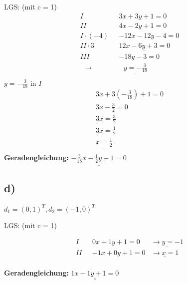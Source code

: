 \documentclass{article}
\begin{document}
LGS: (mit c = 1)
\begin{align*}
    I \ \ \ & 3x + 3y + 1 = 0 \\
    II \ \ \ & 4x - 2y + 1 = 0 \\
    I \cdot (-4) \ \ \ & -12x - 12y - 4 = 0\\
    II \cdot 3 \ \ \ & \underline{ 12x - 6y + 3= 0} \\
    III \ \ \ & -18y - 3 = 0 \\
    \ \ \ \rightarrow & \ \ \ \underline{y = -\frac{3}{18}} \\
\end{align*}
$y = -\frac{3}{18}$ in $I$
\begin{align*}
    3x + 3(-\frac{3}{18}) + 1 = 0 \\
    3x - \frac{3}{2} = 0 \\
    3x = \frac{3}{2}\\
    3x = \frac{1}{2}\\
    \underline{x = \frac{1}{2}} \\
\end{align*}
\textbf{Geradengleichung:} $\underline{\underline{-\frac{3}{18}x - \frac{1}{2}y + 1 = 0}}$

\subsection*{d)}
$d_1 = (0,1)^T, d_2 = (-1,0)^T$

LGS: (mit c = 1)

\begin{align*}
    I \ \ \ & 0x + 1y + 1 = 0 & \underline{\rightarrow y = -1} \\
    II \ \ \ & -1x + 0y + 1 = 0 & \underline{\rightarrow x = 1} \\
\end{align*}

\textbf{Geradengleichung:} $\underline{\underline{1x - 1y + 1 = 0}}$
\end{document}
